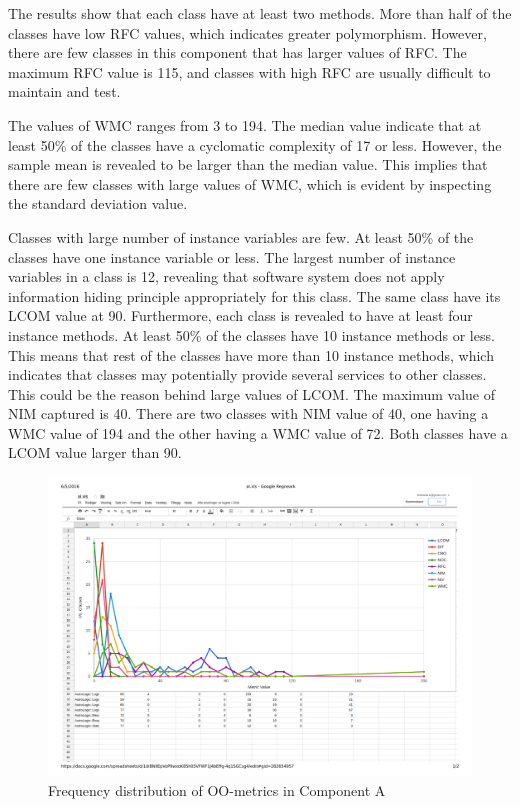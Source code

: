 The results show that each class have at least two methods. More than half of the classes have low RFC values, which indicates greater polymorphism. However, there are few classes in this component that has larger values of RFC. The maximum RFC value is 115, and classes with high RFC are usually difficult to maintain and test. 

The values of WMC ranges from 3 to 194. The median value indicate that at least 50\% of the classes have a cyclomatic complexity of 17 or less. However, the sample mean is revealed to be larger than the median value. This implies that there are few classes with large values of WMC, which is evident by inspecting the standard deviation value.

Classes with large number of instance variables are few. At least 50\% of the classes have one instance variable or less. The largest number of instance variables in a class is 12, revealing that software system does not apply information hiding principle appropriately for this class. The same class have its LCOM value at 90. Furthermore, each class is revealed to have at least four instance methods. At least 50\% of the classes have 10 instance methods or less. This means that rest of the classes have more than 10 instance methods, which indicates that classes may potentially provide several services to other classes. This could be the reason behind large values of LCOM. The maximum value of NIM captured is 40. There are two classes with NIM value of 40, one having a WMC value of 194 and the other having a WMC value of 72. Both classes have a LCOM value larger than 90.




\begin{landscape}
\setlength\LTleft{-.5in}
	\begin{figure}
	\centering
	\includegraphics[width=\textwidth]{images/pdf/al.pdf}
	\caption{Frequency distribution of OO-metrics in Component A}
	\label{fig:algraph}
	\end{figure}
\end{landscape}

